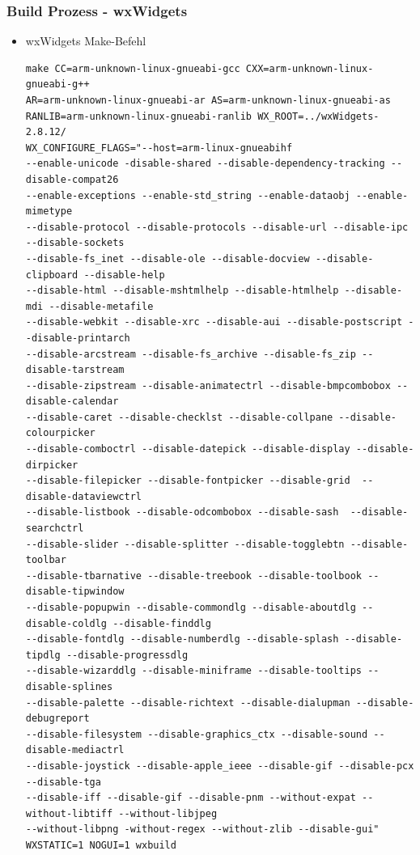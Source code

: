 \documentclass{beamer}
\begin{document}
\begin{frame}[fragile]
\frametitle{Build Prozess - wxWidgets}
\begin{itemize}
\item wxWidgets Make-Befehl
\begin{tiny}
\begin{verbatim}
make CC=arm-unknown-linux-gnueabi-gcc CXX=arm-unknown-linux-gnueabi-g++
AR=arm-unknown-linux-gnueabi-ar AS=arm-unknown-linux-gnueabi-as
RANLIB=arm-unknown-linux-gnueabi-ranlib WX_ROOT=../wxWidgets-2.8.12/
WX_CONFIGURE_FLAGS="--host=arm-linux-gnueabihf
--enable-unicode -disable-shared --disable-dependency-tracking --disable-compat26
--enable-exceptions --enable-std_string --enable-dataobj --enable-mimetype
--disable-protocol --disable-protocols --disable-url --disable-ipc --disable-sockets
--disable-fs_inet --disable-ole --disable-docview --disable-clipboard --disable-help
--disable-html --disable-mshtmlhelp --disable-htmlhelp --disable-mdi --disable-metafile
--disable-webkit --disable-xrc --disable-aui --disable-postscript --disable-printarch
--disable-arcstream --disable-fs_archive --disable-fs_zip --disable-tarstream
--disable-zipstream --disable-animatectrl --disable-bmpcombobox --disable-calendar
--disable-caret --disable-checklst --disable-collpane --disable-colourpicker
--disable-comboctrl --disable-datepick --disable-display --disable-dirpicker
--disable-filepicker --disable-fontpicker --disable-grid  --disable-dataviewctrl
--disable-listbook --disable-odcombobox --disable-sash  --disable-searchctrl
--disable-slider --disable-splitter --disable-togglebtn --disable-toolbar
--disable-tbarnative --disable-treebook --disable-toolbook --disable-tipwindow
--disable-popupwin --disable-commondlg --disable-aboutdlg --disable-coldlg --disable-finddlg
--disable-fontdlg --disable-numberdlg --disable-splash --disable-tipdlg --disable-progressdlg
--disable-wizarddlg --disable-miniframe --disable-tooltips --disable-splines
--disable-palette --disable-richtext --disable-dialupman --disable-debugreport
--disable-filesystem --disable-graphics_ctx --disable-sound --disable-mediactrl
--disable-joystick --disable-apple_ieee --disable-gif --disable-pcx --disable-tga
--disable-iff --disable-gif --disable-pnm --without-expat --without-libtiff --without-libjpeg
--without-libpng -without-regex --without-zlib --disable-gui"
WXSTATIC=1 NOGUI=1 wxbuild
\end{verbatim}
\end{tiny}
\end{itemize}
\end{frame}
\end{document}
